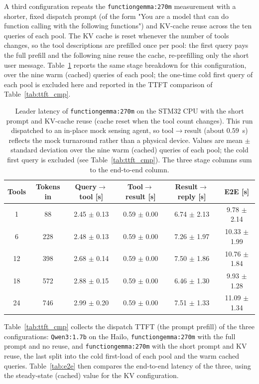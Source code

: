 A third configuration repeats the \texttt{functiongemma:270m} measurement with a
shorter, fixed dispatch prompt (of the form "You are a model that can do function
calling with the following functions") and KV-cache reuse across the ten queries of
each pool. The KV cache is reset whenever the number of tools changes, so the tool
descriptions are prefilled once per pool: the first query pays the full prefill and
the following nine reuse the cache, re-prefilling only the short user message.
Table~\ref{tab:lat_fgemma_kv} reports the same stage breakdown for this
configuration, over the nine warm (cached) queries of each pool; the one-time cold
first query of each pool is excluded here and reported in the TTFT comparison of
Table~\ref{tab:ttft_cmp}.

\begin{table}[H]
\centering
\caption{Leader latency of \texttt{functiongemma:270m} on the STM32 CPU with the
short prompt and KV-cache reuse (cache reset when the tool count changes). This run
dispatched to an in-place mock sensing agent, so tool$\rightarrow$result (about
$0.59$~s) reflects the mock turnaround rather than a physical device. Values are
mean $\pm$ standard deviation over the nine warm (cached) queries of each pool; the
cold first query is excluded (see Table~\ref{tab:ttft_cmp}). The three stage columns
sum to the end-to-end column.}
\label{tab:lat_fgemma_kv}
\small
\begin{tabular}{cccccc}
\toprule
\textbf{Tools} & \textbf{Tokens in} & \textbf{Query$\rightarrow$tool [s]} & \textbf{Tool$\rightarrow$result [s]} & \textbf{Result$\rightarrow$reply [s]} & \textbf{E2E [s]} \\
\midrule
1 & 88 & 2.45 $\pm$ 0.13 & 0.59 $\pm$ 0.00 & 6.74 $\pm$ 2.13 & 9.78 $\pm$ 2.14 \\
6 & 228 & 2.48 $\pm$ 0.13 & 0.59 $\pm$ 0.00 & 7.26 $\pm$ 1.97 & 10.33 $\pm$ 1.99 \\
12 & 398 & 2.68 $\pm$ 0.14 & 0.59 $\pm$ 0.00 & 7.50 $\pm$ 1.86 & 10.76 $\pm$ 1.84 \\
18 & 572 & 2.88 $\pm$ 0.15 & 0.59 $\pm$ 0.00 & 6.46 $\pm$ 1.30 & 9.93 $\pm$ 1.28 \\
24 & 746 & 2.99 $\pm$ 0.20 & 0.59 $\pm$ 0.00 & 7.51 $\pm$ 1.33 & 11.09 $\pm$ 1.34 \\
\bottomrule
\end{tabular}
\end{table}

Table~\ref{tab:ttft_cmp} collects the dispatch TTFT (the prompt prefill) of the
three configurations: \texttt{Qwen3:1.7b} on the Hailo, \texttt{functiongemma:270m}
with the full prompt and no reuse, and \texttt{functiongemma:270m} with the short
prompt and KV reuse, the last split into the cold first-load of each pool and the
warm cached queries. Table~\ref{tab:e2e} then compares the end-to-end latency of the
three, using the steady-state (cached) value for the KV configuration.

